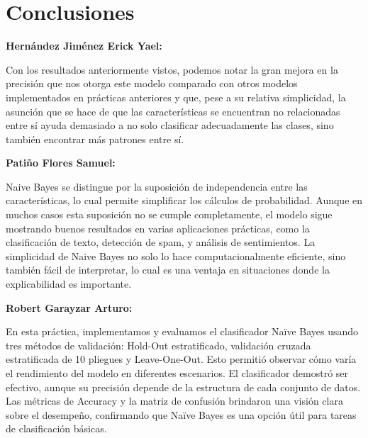 \section{Conclusiones} 
    
\textbf{\Large Hernández Jiménez Erick Yael:}

Con los resultados anteriormente vistos, podemos notar la gran mejora en la precisión que nos otorga este modelo comparado con otros modelos implementados en prácticas anteriores y que, pese a su relativa simplicidad, la asunción que se hace de que las características se encuentran no relacionadas entre sí ayuda demasiado a no solo clasificar adecuadamente las clases, sino también encontrar más patrones entre sí.

\textbf{\Large Patiño Flores Samuel:}

Naive Bayes se distingue por la suposición de independencia entre las características, lo cual permite simplificar los cálculos de probabilidad. Aunque en muchos casos esta suposición no se cumple completamente, el modelo sigue mostrando buenos resultados en varias aplicaciones prácticas, como la clasificación de texto, detección de spam, y análisis de sentimientos. La simplicidad de Naive Bayes no solo lo hace computacionalmente eficiente, sino también fácil de interpretar, lo cual es una ventaja en situaciones donde la explicabilidad es importante.

\textbf{\Large Robert Garayzar Arturo:}

En esta práctica, implementamos y evaluamos el clasificador Naïve Bayes usando tres métodos de validación: Hold-Out estratificado, validación cruzada estratificada de 10 pliegues y Leave-One-Out. Esto permitió observar cómo varía el rendimiento del modelo en diferentes escenarios. El clasificador demostró ser efectivo, aunque su precisión depende de la estructura de cada conjunto de datos. Las métricas de Accuracy y la matriz de confusión brindaron una visión clara sobre el desempeño, confirmando que Naïve Bayes es una opción útil para tareas de clasificación básicas.